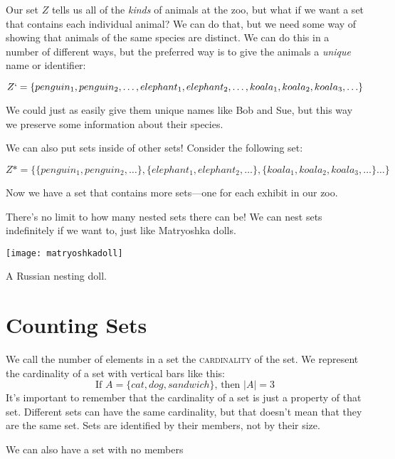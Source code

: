 Our set $Z$ tells us all of the \emph{kinds} of animals at the zoo, but what if we want a set that contains each individual animal? We can do that, but we need some way of showing that animals of the same species are distinct. We can do this in a number of different ways, but the preferred way is to give the animals a \emph{unique} name or identifier:

\[Z`=\{penguin_1, penguin_2,\ldots, elephant_1, elephant_2, \ldots,koala_1, koala_2, koala_3, \ldots\}\]

We could just as easily give them unique names like Bob and Sue, but this way we preserve some information about their species.

We can also put sets inside of other sets! Consider the following set:

\[Z*=\{\{penguin_1, penguin_2,\ldots\}, \{elephant_1, elephant_2, \ldots\},\{koala_1, koala_2, koala_3, \ldots\}\ldots\}\]

Now we have a set that contains more sets---one for each exhibit in our zoo.

There's no limit to how many nested sets there can be! We can nest sets indefinitely if we want to, just like Matryoshka dolls.\begin{marginfigure}
	\texttt{[image: matryoshkadoll]}
	\caption{A Russian nesting doll.}
	\label{fig:matryoshkadoll}
\end{marginfigure}

\section{Counting Sets}

We call the number of elements in a set the \textsc{\gls{cardinality}} of the set. We represent the cardinality of a set with vertical bars like this:
\[\text{If }A=\{cat, dog, sandwich\}\text{, then }|A|=3\]
It's important to remember that the cardinality of a set is just a property of that set. Different sets can have the same cardinality, but that doesn't mean that they are the same set. Sets are identified by their members, not by their size.


We can also have a set with no members
